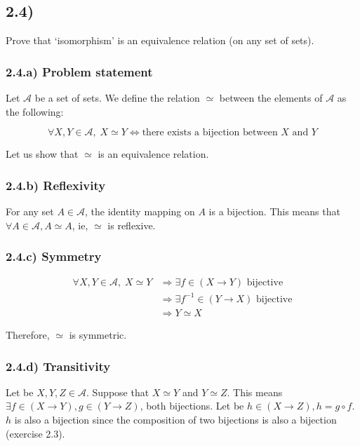 \documentclass[12pt, letterpaper, twoside]{report}
\begin{document}
\subsection*{2.4)}

Prove that ‘isomorphism’ is an equivalence relation (on any set of sets).

\subsubsection*{2.4.a) Problem statement}

Let $\mathcal{A}$ be a set of sets. We define the relation $\simeq$ between the elements of $\mathcal{A}$ as the following:

$$\forall X, Y \in \mathcal{A}, \; X \simeq Y \Leftrightarrow \text {there exists a bijection between $X$ and $Y$}$$

Let us show that $\simeq$ is an equivalence relation.


\subsubsection*{2.4.b) Reflexivity}

For any set $A \in \mathcal{A}$, the identity mapping on $A$ is a bijection. This means that $\forall A \in \mathcal{A}, A \simeq A$, ie, $\simeq$ is reflexive.


\subsubsection*{2.4.c) Symmetry}

$$
\begin{aligned}
\forall X, Y \in \mathcal{A}, \; X \simeq Y & \Rightarrow \exists f      \in (X \to Y) \text{ bijective} \\
                                            & \Rightarrow \exists f^{-1} \in (Y \to X) \text{ bijective} \\
                                            & \Rightarrow Y \simeq X
\end{aligned}
$$

Therefore, $\simeq$ is symmetric.


\subsubsection*{2.4.d) Transitivity}

Let be $X, Y, Z \in \mathcal{A}$.
Suppose that $X \simeq Y$ and $Y \simeq Z$.
This means $\exists f \in (X \to Y), g \in (Y \to Z)$, both bijections.
Let be $h \in (X \to Z), h = g \circ f$. $h$ is also a bijection since the composition of two bijections is also a bijection (exercise 2.3).
\end{document}
